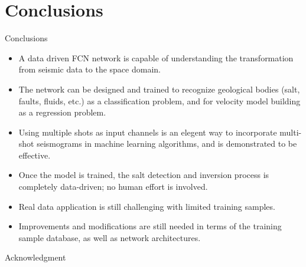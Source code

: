 \documentclass[aspectratio=169]{beamer}
\begin{document}
\section{Conclusions}
\begin{frame}{Conclusions}
\begin{itemize}
\item{A data driven FCN network is capable of understanding the transformation from seismic data to the space domain.}
\item{The network can be designed and trained to recognize geological bodies (salt, faults, fluids, etc.) as a classification problem, and for velocity model building as a regression problem.}
\item{Using multiple shots as input channels is an elegent way to incorporate multi-shot seismograms in machine learning algorithms, and is demonstrated to be effective.}
\item{Once the model is trained, the salt detection and inversion process is completely data-driven; no human effort is involved.}
\item{Real data application is still challenging with limited training samples.}
\item{Improvements and modifications are still needed in terms of the training sample database, as well as network architectures.}
\end{itemize}
\end{frame}
\begin{frame}{Acknowledgment}
\end{frame}


\end{document}
